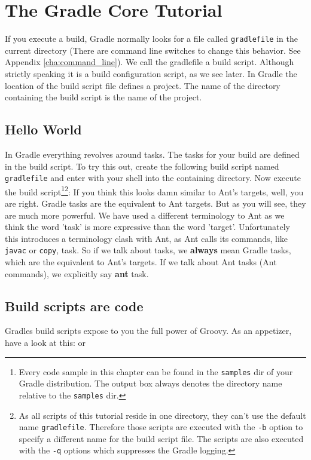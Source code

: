 \chapter{The Gradle Core Tutorial}
\label{cha:gradle_core_tutorial}
If you execute a build, Gradle normally looks for a file called \texttt{gradlefile} in the current directory (There are command line switches to change this behavior. See Appendix \ref{cha:command_line}). We call the gradlefile a build script. Although strictly speaking it is a build configuration script, as we see later. In Gradle the location of the build script file defines a project. The name of the directory containing the build script is the name of the project.  

\section{Hello World}
In Gradle everything revolves around tasks. The tasks for your build are defined in the build script. To try this out, create the following build script named \texttt{gradlefile} and enter with your shell into the containing directory.
Now execute the build script\footnote{Every code sample in this chapter can be found in the \texttt{samples} dir of your Gradle distribution. The output box always denotes the directory name relative to the \texttt{samples} dir.}\footnote{As all scripts of this tutorial reside in one directory, they can't use the default name \texttt{gradlefile}. Therefore those scripts are executed with the \texttt{-b} option to specify a different name for the build script file. The scripts are also executed with the \texttt{-q} options which suppresses the Gradle logging.}:
If you think this looks damn similar to Ant's targets, well, you are right. Gradle tasks are the equivalent to Ant targets. But as you will see, they are much more powerful. We have used a different terminology to Ant as we think the word 'task' is more expressive than the word 'target'. Unfortunately this introduces a terminology clash with Ant, as Ant calls its commands, like \texttt{javac} or \texttt{copy}, task. So if we talk about tasks, we \textbf{always} mean Gradle tasks, which are the equivalent to Ant's targets. If we talk about Ant tasks (Ant commands), we explicitly say \textbf{ant} task.

\section{Build scripts are code}
Gradles build scripts expose to you the full power of Groovy. As an appetizer, have a look at this:
or

